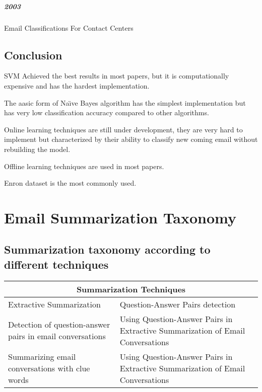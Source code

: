 \subparagraph{2003}
\begin{my_itemize}
  \item Email Classifications For Contact Centers \cite{ANI03}
\end{my_itemize}


\subsection{Conclusion}
\begin{my_itemize}
    \item SVM Achieved the best results in most papers, but it is computationally expensive and has the hardest implementation.
    \item The aasic form of Na\"{\i}ve Bayes algorithm has the simplest implementation but has very low classification accuracy compared to other algorithms.
    \item Online learning techniques are still under development, they are very hard to implement but characterized by their
    ability to classify new coming email without rebuilding the model.
    \item Offline learning techniques are used in most papers.
    \item Enron dataset is the most commonly used.
\end{my_itemize}

\newpage
\section{Email Summarization Taxonomy}

\subsection{Summarization taxonomy according to different techniques}

\begin{center}
\begin{tabular}{|p{6cm}|p{6cm}|}
\hline
\multicolumn{2}{|c|}{Summarization Techniques} \\
\hline
Extractive Summarization & Question-Answer Pairs detection
\\ \hline
Detection of question-answer pairs in email conversations \cite{LOKESH04} &
Using Question-Answer Pairs in Extractive Summarization of Email Conversations \cite{KATHLEEN07} 
\\ \hline

Summarizing email conversations with clue words \cite{GIUSEPPE07} &
Using Question-Answer Pairs in Extractive Summarization of Email Conversations \cite{KATHLEEN07}
\\ \hline

\end{tabular}
\end{center}


